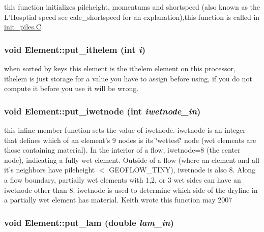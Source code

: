 this function initializes pileheight, momentums and shortspeed (also known as the L'Hosptial speed see calc\_\-shortspeed for an explanation),this function is called in \hyperlink{constant_8h_a21}{init\_\-piles.C} 

\hypertarget{classElement_a118}{
\subsubsection[put\_\-ithelem]{\setlength{\rightskip}{0pt plus 5cm}void Element::put\_\-ithelem (int {\em i})}}
\label{classElement_a118}


when sorted by keys this element is the ithelem element on this processor, ithelem is just storage for a value you have to assign before using, if you do not compute it before you use it will be wrong. 

\hypertarget{classElement_a126}{
\subsubsection[put\_\-iwetnode]{\setlength{\rightskip}{0pt plus 5cm}void Element::put\_\-iwetnode (int {\em iwetnode\_\-in})}}
\label{classElement_a126}


this inline member function sets the value of iwetnode. iwetnode is an integer that defines which of an element's 9 nodes is its \char`\"{}wettest\char`\"{} node (wet elements are those containing material). In the interior of a flow, iwetnode=8 (the center node), indicating a fully wet element. Outside of a flow (where an element and all it's neighbors have pileheight $<$ GEOFLOW\_\-TINY), iwetnode is also 8. Along a flow boundary, partially wet elements with 1,2, or 3 wet sides can have an iwetnode other than 8. iwetnode is used to determine which side of the dryline in a partially wet element has material. Keith wrote this function may 2007 

\hypertarget{classElement_a92}{
\subsubsection[put\_\-lam]{\setlength{\rightskip}{0pt plus 5cm}void Element::put\_\-lam (double {\em lam\_\-in})}}
\label{classElement_a92}



